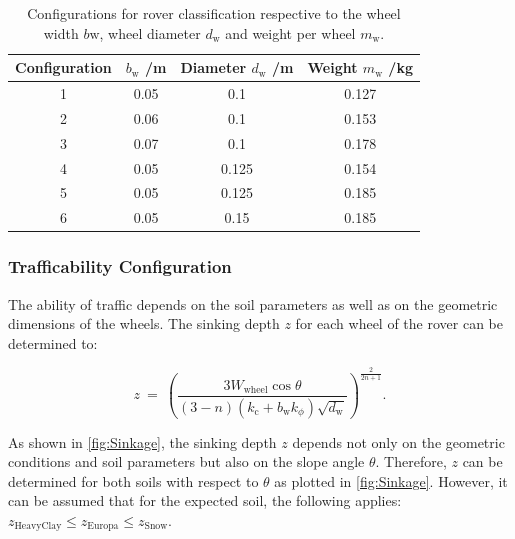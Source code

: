 \begin{table}[htb]
\centering
\caption{Configurations for rover classification respective to the wheel width \(b\text{w}\), wheel diameter \(d_\text{w}\) and weight per wheel \(m_\text{w}\).}
\begin{adjustbox}{max width=\textwidth}
\begin{tabular}[l]{cccc}

	\toprule
		\multicolumn{1}{l}{Configuration} & \multicolumn{1}{c}{\(b_\text{w}\) /m} & \multicolumn{1}{c}{Diameter \(d_\text{w}\) /m} & \multicolumn{1}{c}{Weight \(m_\text{w}\) /kg}   \\

	\midrule
		
		1	&	0.05	&	0.1		&	0.127		\\	
		2	&	0.06	&	0.1		&	0.153		\\
		3	&	0.07	&	0.1		&	0.178		\\
		4	&	0.05	&	0.125	&	0.154		\\
		5	&	0.05	&	0.125	&	0.185		\\
		6	&	0.05	&	0.15	&	0.185		\\

	\bottomrule

\end{tabular}
\end{adjustbox}
\label{tab:Configurations}
\end{table}



\subsubsection*{Trafficability Configuration}
\label{sec:DP}

The ability of traffic depends on the soil parameters as well as on the geometric dimensions of the wheels. The sinking depth \(z\) for each wheel of the rover can be determined to:

\begin{equation}
	z \:  = \:	\left( \frac{3 W_\text{wheel} \cos \theta}{(3-n)(k_\text{c} + b_\text{w}k_\phi) \sqrt{d_\text{w}}} \right) ^{\frac{2}{2n+1}}	.
	\label{eq:Sinkage}
\end{equation}

As shown in \autoref{fig:Sinkage}, the sinking depth \(z\) depends not only on the geometric conditions and soil parameters but also on the slope angle \(\theta\). Therefore, \(z\) can be determined for both soils with respect to \(\theta\) as plotted in \autoref{fig:Sinkage}. However, it can be assumed that for the expected soil, the following applies: \( z_{\text{HeavyClay}} \leq z_{\text{Europa}} \leq z_{\text{Snow}} \).

